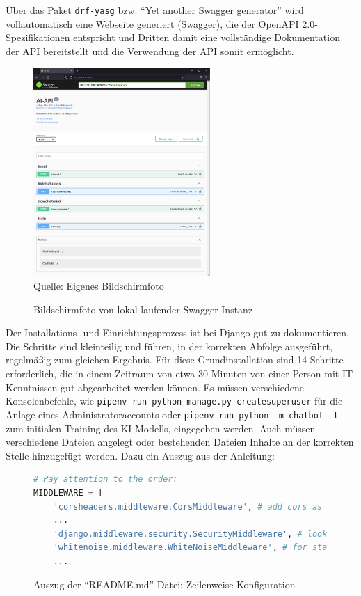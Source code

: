 \documentclass[12pt,oneside,titlepage,listof=totoc,bibliography=totoc]{scrartcl}
\newcommand{\code}[1]{\colorbox{code-gray}{\texttt{#1}}}
\begin{document}
Über das Paket \code{drf-yasg} bzw. \enquote{Yet another Swagger generator} \zb wird vollautomatisch eine Webseite generiert (Swagger), die der OpenAPI 2.0-Spezifikationen entspricht und Dritten damit eine vollständige Dokumentation der API bereitstellt und die Verwendung der API somit ermöglicht. 

\begin{figure}[H]
	\caption{Bildschirmfoto von lokal laufender Swagger-Instanz}\label{fig:local-swagger}
	\includegraphics[width=0.60\textwidth]{swagger.png}
	\\
	Quelle: Eigenes Bildschirmfoto
\end{figure}


Der Installations- und Einrichtungsprozess  ist bei Django gut zu dokumentieren. Die Schritte sind kleinteilig und führen, in der korrekten Abfolge ausgeführt, regelmäßig zum gleichen Ergebnis. Für diese Grundinstallation sind 14 Schritte erforderlich, die in einem Zeitraum von etwa 30 Minuten von einer  Person mit IT-Kenntnissen gut abgearbeitet werden können. Es müssen \zb verschiedene Konsolenbefehle, wie \zb \code{pipenv run python manage.py createsuperuser} für die Anlage eines Administratoraccounts oder \code{pipenv run python -m chatbot -t} zum initialen Training des KI-Modells, eingegeben werden. Auch müssen verschiedene Dateien angelegt oder bestehenden Dateien Inhalte an der korrekten Stelle hinzugefügt werden. Dazu ein Auszug aus der Anleitung: 

\begin{figure}[H]
	\caption{Auszug der \enquote{README.md}-Datei: Zeilenweise Konfiguration}
	\label{fig:code-django-readme}
\begin{lstlisting}[language=python]
# Pay attention to the order:
MIDDLEWARE = [
    'corsheaders.middleware.CorsMiddleware', # add cors as the first line
    ...
    'django.middleware.security.SecurityMiddleware', # look out for this line and insert whitenoise below
    'whitenoise.middleware.WhiteNoiseMiddleware', # for static files
    ...
\end{lstlisting}
\end{figure}
\end{document}
